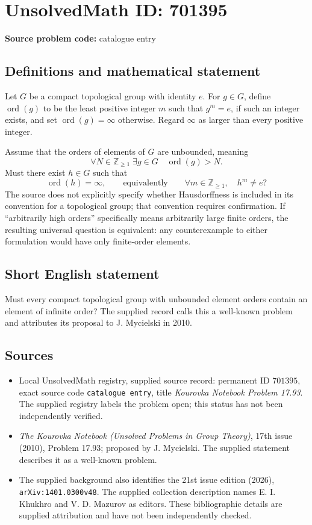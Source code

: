 \documentclass[11pt]{article}
\newcommand{\Z}{\mathbb{Z}}
\begin{document}
\section*{UnsolvedMath ID: 701395}
\textbf{Source problem code:} catalogue entry
\subsection{Definitions and mathematical statement}
Let \(G\) be a compact topological group with identity \(e\). For \(g\in G\), define \(\operatorname{ord}(g)\) to be the least positive integer \(m\) such that \(g^m=e\), if such an integer exists, and set \(\operatorname{ord}(g)=\infty\) otherwise. Regard \(\infty\) as larger than every positive integer.

Assume that the orders of elements of \(G\) are unbounded, meaning
\[
\forall N\in\Z_{\geq 1}\;\exists g\in G\quad \operatorname{ord}(g)>N.
\]
Must there exist \(h\in G\) such that
\[
\operatorname{ord}(h)=\infty,
\qquad\text{equivalently}\qquad
\forall m\in\Z_{\geq 1},\quad h^m\ne e?
\]
The source does not explicitly specify whether Hausdorffness is included in its convention for a topological group; that convention requires confirmation. If ``arbitrarily high orders'' specifically means arbitrarily large finite orders, the resulting universal question is equivalent: any counterexample to either formulation would have only finite-order elements.
\subsection{Short English statement}
Must every compact topological group with unbounded element orders contain an element of infinite order? The supplied record calls this a well-known problem and attributes its proposal to J. Mycielski in 2010.
\subsection{Sources}
\begin{itemize}
\item Local UnsolvedMath registry, supplied source record: permanent ID \(701395\), exact source code \texttt{catalogue entry}, title \emph{Kourovka Notebook Problem 17.93}. The supplied registry labels the problem open; this status has not been independently verified.
\item \emph{The Kourovka Notebook (Unsolved Problems in Group Theory)}, 17th issue (2010), Problem 17.93; proposed by J. Mycielski. The supplied statement describes it as a well-known problem.
\item The supplied background also identifies the 21st issue edition (2026), \texttt{arXiv:1401.0300v48}. The supplied collection description names E. I. Khukhro and V. D. Mazurov as editors. These bibliographic details are supplied attribution and have not been independently checked.
\end{itemize}
\end{document}

